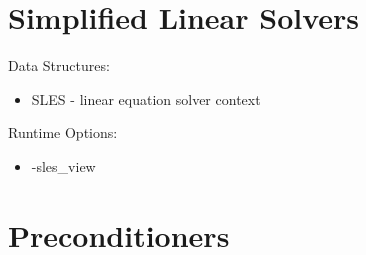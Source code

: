 {

{\footnotesize
\noindent



}

\section{Simplified Linear Solvers}

\noindent
Data Structures:
\begin{itemize}
\item SLES - linear equation solver context
\end{itemize}
Runtime Options:
\begin{itemize}
\item -sles\_view
\end{itemize}


{\footnotesize
\noindent

}

\section{Preconditioners}

}

